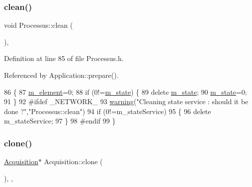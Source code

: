 \subsubsection{\texorpdfstring{clean()}{clean()}}
{\footnotesize\ttfamily void Processus\+::clean (\begin{DoxyParamCaption}{ }\end{DoxyParamCaption})\hspace{0.3cm}{\ttfamily [inline]}, {\ttfamily [inherited]}}



Definition at line 85 of file Processus.\+h.



Referenced by Application\+::prepare().


\begin{DoxyCode}
86   \{
87     \hyperlink{classProcessus_aa9d24d53c3e52f36786cabb5d8e296e7}{m\_element}=0;
88     \textcolor{keywordflow}{if} (0!=\hyperlink{classProcessus_ab3539eee42891ceae0baf4395ae7fb61}{m\_state}) \{
89       \textcolor{keyword}{delete} \hyperlink{classProcessus_ab3539eee42891ceae0baf4395ae7fb61}{m\_state};
90       \hyperlink{classProcessus_ab3539eee42891ceae0baf4395ae7fb61}{m\_state}=0;
91     \}
92 \textcolor{preprocessor}{#ifdef \_NETWORK\_
}
93     \hyperlink{classObject_a65cd4fda577711660821fd2cd5a3b4c9}{warning}(\textcolor{stringliteral}{"Cleaning state service : should it be done ?"},\textcolor{stringliteral}{"Processus::clean"})
94       if (0!=m\_stateService)
95       \{
96         \textcolor{keyword}{delete} m\_stateService;
97       \}
98 \textcolor{preprocessor}{#endif
}
99   \}
\end{DoxyCode}
\mbox{\label{classAcquisition_a4b1b690ef27f20b3e1ad9383f2f57628}} 
\subsubsection{\texorpdfstring{clone()}{clone()}\hspace{0.1cm}{\footnotesize\ttfamily [1/2]}}
{\footnotesize\ttfamily \hyperlink{classAcquisition_1_1Acquisition}{Acquisition}$\ast$ Acquisition\+::clone (\begin{DoxyParamCaption}{ }\end{DoxyParamCaption})\hspace{0.3cm}{\ttfamily [inline]}, {\ttfamily [protected]}, {\ttfamily [virtual]}}

